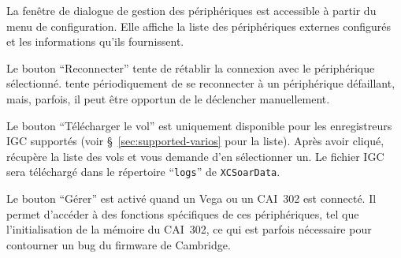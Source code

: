 La fenêtre de dialogue de gestion des périphériques est accessible à partir du menu de configuration.
Elle affiche la liste des périphériques externes configurés et les informations qu'ils fournissent.

Le bouton ``Reconnecter'' tente de rétablir la connexion avec le périphérique sélectionné.
\xc{} tente périodiquement de se reconnecter à un périphérique défaillant, mais, parfois, il peut être opportun de le déclencher manuellement.

Le bouton ``Télécharger le vol'' est uniquement disponible pour les enregistreurs IGC supportés (voir §~\ref{sec:supported-varios} pour la liste).
Après avoir cliqué, \xc{} récupère la liste des vols et vous demande d'en sélectionner un. 
Le fichier IGC sera téléchargé dans le répertoire ``\texttt{logs}'' de \texttt{XCSoarData}.

Le bouton ``Gérer'' est activé quand un Vega ou un CAI~302 est connecté.
Il permet d'accéder à des fonctions spécifiques de ces périphériques, tel que l'initialisation de la mémoire du CAI~302, ce qui est parfois nécessaire pour contourner un bug du firmware de Cambridge.
